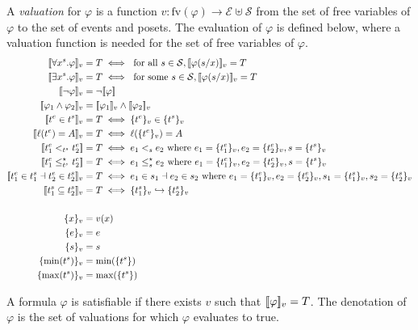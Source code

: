 A \emph{valuation} for $\varphi$ is a function
$v:\text{fv}(\varphi)\to\mathcal{E}\uplus\mathcal{S}$
from the set of free variables of $\varphi$ to the set of events and posets.
%
The evaluation of $\varphi$ is defined below, where a valuation function is needed for the set of free variables of $\varphi$.
\begin{align*}
  \enc{\forall x^s.\varphi}_{v} &= T \iff\text{ for all }s\in\mathcal{S}, \enc{\varphi(s/x)}_{v} = T\\
  \enc{\exists x^s.\varphi}_{v} &= T \iff\text{ for some }s\in\mathcal{S}, \enc{\varphi(s/x)}_{v} = T\\
  \enc{\neg\varphi}_v &= \neg\enc{\varphi} \\
  \enc{\varphi_1\wedge\varphi_2}_v &= \enc{\varphi_1}_v\wedge\enc{\varphi_2}_v\\
  \enc{t^e\in t^s}_v &= T\iff\enct{t^e}_v\in\enct{t^s}_v\\
  \enc{\labl(t^e) = A}_v &= T\iff\labl(\enct{t^e}_v)=A\\
  \enc{t^e_1 <_{t^s} t^e_2} &= T\iff e_1 <_s e_2\text{ where }e_1 = \enct{t^e_1}_v,e_2 = \enct{t^e_2}_v,s = \enct{t^s}_v\\
  \enc{t^e_1 \tleq_{t^s} t^e_2} &= T\iff e_1 \tleq_s e_2\text{ where }e_1 = \enct{t^e_1}_v,e_2 = \enct{t^e_2}_v,s = \enct{t^s}_v\\
  \enc{t^e_1\in t^s_1 \dashv t^e_2\in t^s_2}_v &= T\iff e_1\in s_1 \dashv e_2\in s_2\text{ where }
  e_1 = \enct{t^e_1}_v,e_2 = \enct{t^e_2}_v,s_1 = \enct{t^s_1}_v,s_2 = \enct{t^s_2}_v\\
  \enc{t^s_1\subseteq t^s_2}_v &= T\iff\enct{t^s_1}_v\emb \enct{t^s_2}_v\\
  \\
  \enct{x}_{v} &= v(x)\\
  \enct{e}_{v} &= e\\
  \enct{s}_{v} &= s\\
  \enct{\text{min}(t^s)}_{v} &= \text{min}(\enct{t^s})\\
  \enct{\text{max}(t^s)}_{v} &= \text{max}(\enct{t^s})\\
\end{align*}

A formula $\varphi$ is satisfiable if there exists $v$ such that $[\![\varphi]\!]_v = T$.
The denotation of $\varphi$ is the set of valuations for which $\varphi$ evaluates to true.
